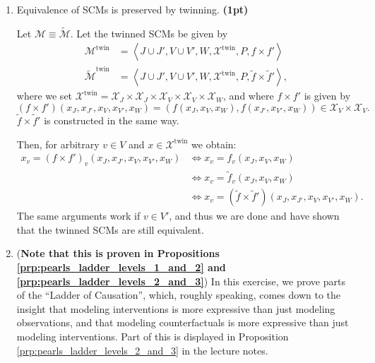 \begin{enumerate}
	\item Equivalence of SCMs is preserved by twinning. \textbf{(1pt)}
	\begin{gradedsolution}
		Let $\mathcal{M} \equiv \widetilde{\mathcal{M}}$. Let the twinned SCMs be given by
		\begin{align*}
			\mathcal{M}^{\text{twin}}             & = \left\langle J \cup J', V \cup V', W, \mathcal{X}^{\text{twin}}, P, f \times f' \right\rangle                          \\
			\widetilde{\mathcal{M}}^{\text{twin}} & = \left\langle J \cup J', V \cup V', W, \mathcal{X}^{\text{twin}}, P, \widetilde{f} \times \widetilde{f}' \right\rangle,
		\end{align*}
		where we set $\mathcal{X}^{\text{twin}} = \mathcal{X}_J \times \mathcal{X}_{J} \times \mathcal{X}_{V} \times \mathcal{X}_V \times \mathcal{X}_W$, and where $f \times f'$ is given by
		\begin{equation*}
			(f \times f')(x_J, x_{J'}, x_V, x_{V'}, x_W) = (f(x_J, x_V, x_W), f(x_{J'}, x_{V'}, x_W)) \in \mathcal{X}_V \times \mathcal{X}_{V}.
		\end{equation*}
		$\widetilde{f} \times \widetilde{f}'$ is constructed in the same way.

		Then, for arbitrary $v \in V$ and $x \in \mathcal{X}^{\text{twin}}$ we obtain:
		\begin{align*}
			x_v = (f \times f')_v(x_J, x_{J'}, x_V, x_{V'}, x_W) & \Longleftrightarrow x_v = f_v(x_J, x_V, x_W)                                                    \\
			                                                     & \Longleftrightarrow x_v = \widetilde{f}_v(x_J, x_V, x_W)                                        \\
			                                                     & \Longleftrightarrow x_v = (\widetilde{f} \times \widetilde{f}')(x_J, x_{J'}, x_V, x_{V'}, x_W).
		\end{align*}
		The same arguments work if $v \in V'$, and thus we are done and have shown that the twinned SCMs are still equivalent.
	\end{gradedsolution}

	\item %
	      (\textbf{Note that this is proven in Propositions \ref*{prp:pearls_ladder_levels_1_and_2} and \ref*{prp:pearls_ladder_levels_2_and_3}})
	In this exercise, we prove parts of the ``Ladder of Causation'', which, roughly speaking, comes down to the insight that modeling interventions is more expressive than just modeling observations, and that modeling counterfactuals is more expressive than just modeling interventions.
	Part of this is displayed in Proposition \ref*{prp:pearls_ladder_levels_2_and_3} in the lecture notes.


\end{enumerate}

